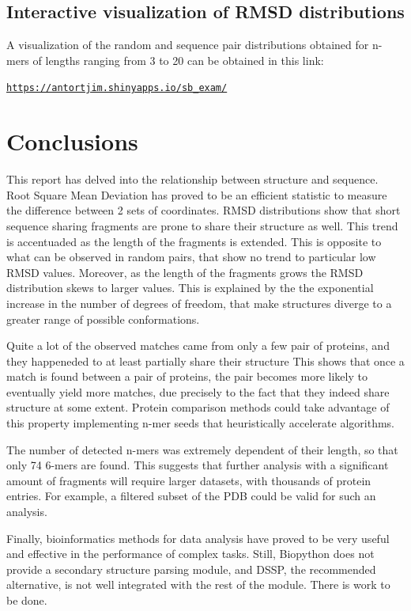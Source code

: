 \documentclass[a4paper, 11pt]{article} %
\begin{document}
\subsection{Interactive visualization of RMSD distributions}

A visualization of the random and sequence pair distributions obtained for n-mers of lengths ranging from 3 to 20 can be obtained in this link:

\color{blue}
\texttt{\href{https://antortjim.shinyapps.io/sb\_exam/}{https://antortjim.shinyapps.io/sb\_exam/}}
\color{black}

\section{Conclusions}

This report has delved into the relationship between structure and sequence. Root Square Mean Deviation has proved to be an efficient statistic to measure the difference between 2 sets of coordinates. RMSD distributions show that short sequence sharing fragments are prone to share their structure as well. This trend is accentuaded as the length of the fragments is extended. This is opposite to what can be observed in random pairs, that show no trend to particular low RMSD values. Moreover, as the length of the fragments grows the RMSD distribution skews to larger values. This is explained by the the exponential increase in the number of degrees of freedom, that make structures diverge to a greater range of possible conformations.

Quite a lot of the observed matches came from only a few pair of proteins, and they happeneded to at least partially share their structure This shows that once a match is found between a pair of proteins, the pair becomes more likely to eventually yield more matches, due precisely to the fact that they indeed share structure at some extent. Protein comparison methods could take advantage of this property implementing n-mer seeds that heuristically accelerate algorithms.

The number of detected n-mers was extremely dependent of their length, so that only 74 6-mers are found. This suggests that further analysis with a significant amount of fragments will require larger datasets, with thousands of protein entries. For example, a filtered subset of the PDB could be valid for such an analysis.

Finally, bioinformatics methods for data analysis have proved to be very useful and effective in the performance of complex tasks. Still, Biopython does not provide a secondary structure parsing module, and DSSP, the recommended alternative, is not well integrated with the rest of the module. There is work to be done. 


%


\end{document}
